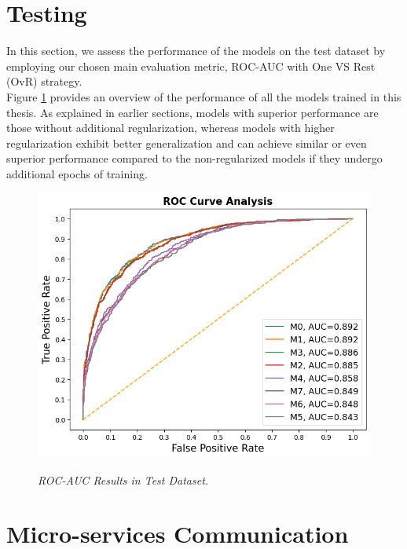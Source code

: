\newpage

\section{Testing}

In this section, we assess the performance of the models on the test dataset by
employing our chosen main evaluation metric, ROC-AUC with One VS Rest (OvR)
strategy. \\

Figure \ref{fig:rocaucanalysis-all} provides an overview of the
performance of all the models trained in this thesis. As explained in earlier
sections, models with superior performance are those without additional
regularization, whereas models with higher regularization exhibit better
generalization and can achieve similar or even superior performance compared to
the non-regularized models if they undergo additional epochs of training.

\begin{figure}[H]
  \centering
  \includegraphics[width=\textwidth]{imatges/results/rocaucanalysis-all.png}
  \caption[ROC-AUC Results in Test Dataset]{\textit{ROC-AUC Results in Test Dataset. }}
  {\label{fig:rocaucanalysis-all}}
\end{figure}

\newpage


\section{Micro-services Communication}


